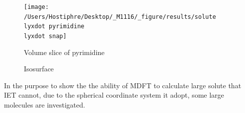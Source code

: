 \begin{figure}
\begin{centering}
\texttt{[image: /Users/Hostiphre/Desktop/\_M1116/\_figure/results/solute\\lyxdot pyrimidine\\lyxdot snap]}
\par\end{centering}
\caption{Volume slice of pyrimidine}
\end{figure}

\begin{figure}

\caption{Isosurface}
\end{figure}

In the purpose to show the the ability of \acs{MDFT} to calculate
large solute that \acs{IET} cannot, due to the spherical coordinate
system it adopt, some large molecules are investigated.
